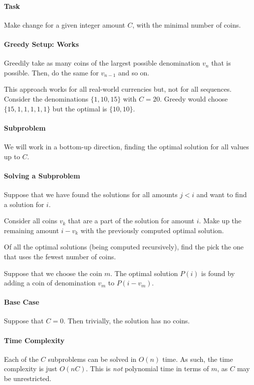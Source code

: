 \paragraph{Task}
Make change for a given integer amount \(C\), with the minimal number of coins.

\paragraph{Greedy Setup: Works}
Greedily take as many coins of the largest possible denomination \(v_n\)
that is possible. Then, do the same for \(v_{n - 1}\) and so on.

This approach works for all real-world currencies but, not for all sequences.
Consider the denominations \(\{1, 10, 15\}\) with \(C = 20\). Greedy would choose
 \(\{15, 1, 1, 1, 1, 1\} \) but the optimal is \(\{10, 10\}\).

\paragraph{Subproblem}
We will work in a bottom-up direction, finding the optimal solution for all
values up to \(C\).

\paragraph{Solving a Subproblem}
Suppose that we have found the solutions for all amounts \(j < i\)
and want to find a solution for \(i\).

Consider all coins \(v_k\) that are a part of the solution for amount \(i\).
Make up the remaining amount \(i - v_k\) with the previously computed optimal solution.

Of all the optimal solutions (being computed recursively), find the pick the one that uses
the fewest number of coins.

Suppose that we choose the coin \(m\). The optimal solution  \(P(i)\) is found
by adding a coin of denomination  \(v_m\) to  \(P(i - v_m)\).

\paragraph{Base Case}
Suppose that \(C = 0\). Then trivially, the solution has no coins.

\paragraph{Time Complexity}
Each of the \(C\) subproblems can be solved in \(O(n)\) time. As such, the time complexity
is just  \(O(nC)\).
This is \textit{not} polynomial time in terms of \(m\), as \(C\) may be unrestricted.


